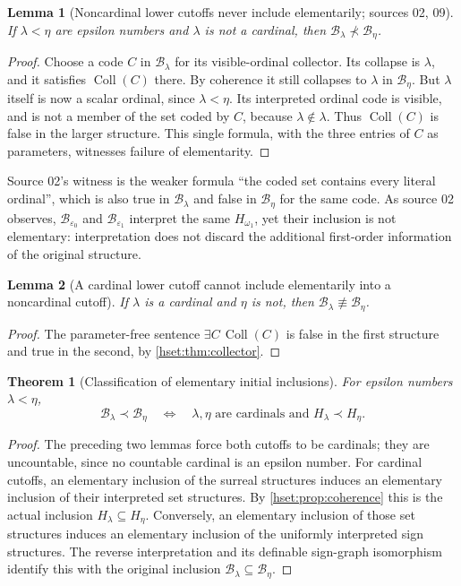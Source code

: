 \documentclass[11pt,letterpaper]{article}
\newtheorem{theorem}{Theorem}[section]
\newtheorem{lemma}[lemma]{Lemma}\aliascntresetthe{lemma}
\theoremstyle{definition}
\theoremstyle{remark}
\newcommand{\B}{\mathcal B}
\newcommand{\Coll}{\operatorname{Coll}}
\begin{document}
\begin{lemma}[Noncardinal lower cutoffs never include elementarily; sources 02, 09]
\label{hset:lem:lower-noncardinal}
If $\lambda<\eta$ are epsilon numbers and $\lambda$ is not a cardinal, then
$\B_\lambda\not\prec\B_\eta$.
\end{lemma}
\begin{proof}
Choose a code $C$ in $\B_\lambda$ for its visible-ordinal collector. Its
collapse is $\lambda$, and it satisfies $\Coll(C)$ there. By coherence it
still collapses to $\lambda$ in $\B_\eta$. But $\lambda$ itself is now a
scalar ordinal, since $\lambda<\eta$. Its interpreted ordinal code is
visible, and is not a member of the set coded by $C$, because
$\lambda\notin\lambda$. Thus $\Coll(C)$ is false in the larger structure.
This single formula, with the three entries of $C$ as parameters, witnesses
failure of elementarity.
\end{proof}

Source 02's witness is the weaker formula ``the coded set contains every
literal ordinal'', which is also true in $\B_\lambda$ and false in $\B_\eta$
for the same code. As source 02 observes, $\B_{\varepsilon_0}$ and
$\B_{\varepsilon_1}$ interpret the same $H_{\omega_1}$, yet their inclusion is
not elementary: interpretation does not discard the additional first-order
information of the original structure.

\begin{lemma}[A cardinal lower cutoff cannot include elementarily into a
noncardinal cutoff]
\label{hset:lem:upper-noncardinal}
If $\lambda$ is a cardinal and $\eta$ is not, then
$\B_\lambda\not\equiv\B_\eta$.
\end{lemma}
\begin{proof}
The parameter-free sentence $\exists C\,\Coll(C)$ is false in the first
structure and true in the second, by \cref{hset:thm:collector}.
\end{proof}

\begin{theorem}[Classification of elementary initial inclusions]
\label{hset:thm:elementary}
For epsilon numbers $\lambda<\eta$,
\[
 \B_\lambda\prec\B_\eta
 \quad\Longleftrightarrow\quad
 \lambda,\eta\text{ are cardinals and }H_\lambda\prec H_\eta.
\]
\end{theorem}
\begin{proof}
The preceding two lemmas force both cutoffs to be cardinals; they are
uncountable, since no countable cardinal is an epsilon number. For cardinal
cutoffs, an elementary inclusion of the surreal structures induces an
elementary inclusion of their interpreted set structures. By
\cref{hset:prop:coherence} this is the actual inclusion
$H_\lambda\subseteq H_\eta$. Conversely, an elementary inclusion of those set
structures induces an elementary inclusion of the uniformly interpreted sign
structures. The reverse interpretation and its definable sign-graph
isomorphism identify this with the original inclusion
$\B_\lambda\subseteq\B_\eta$.
\end{proof}
\end{document}
